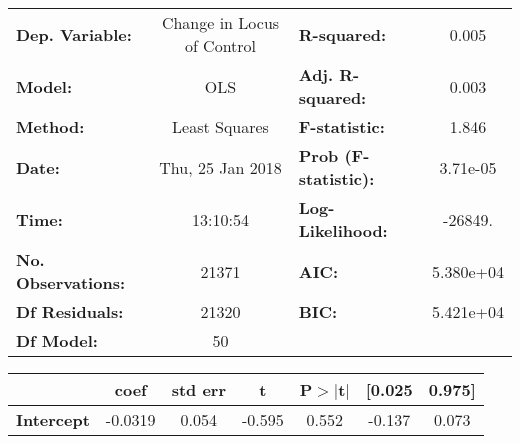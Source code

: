 \begin{center}
 \begin{tabular}{lclc}
 \toprule
 \textbf{Dep. Variable:}                                                                                              & Change in Locus of Control & \textbf{  R-squared:         } &     0.005   \\
 \textbf{Model:}                                                                                                      &        OLS         & \textbf{  Adj. R-squared:    } &     0.003   \\
 \textbf{Method:}                                                                                                     &   Least Squares    & \textbf{  F-statistic:       } &     1.846   \\
 \textbf{Date:}                                                                                                       &  Thu, 25 Jan 2018  & \textbf{  Prob (F-statistic):} &  3.71e-05   \\
 \textbf{Time:}                                                                                                       &      13:10:54      & \textbf{  Log-Likelihood:    } &   -26849.   \\
 \textbf{No. Observations:}                                                                                           &        21371       & \textbf{  AIC:               } & 5.380e+04   \\
 \textbf{Df Residuals:}                                                                                               &        21320       & \textbf{  BIC:               } & 5.421e+04   \\
 \textbf{Df Model:}                                                                                                   &           50       & \textbf{                     } &             \\
 \bottomrule
 \end{tabular}
 \begin{tabular}{lcccccc}
                                                                                                                      & \textbf{coef} & \textbf{std err} & \textbf{t} & \textbf{P$>$$|$t$|$} & \textbf{[0.025} & \textbf{0.975]}  \\
 \midrule
 \textbf{Intercept}                                                                                                   &      -0.0319  &        0.054     &    -0.595  &         0.552        &       -0.137    &        0.073     \\

\end{tabular}
\end{center}
